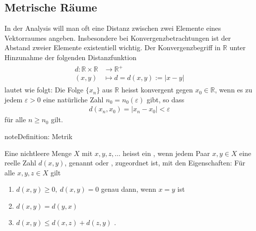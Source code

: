 \documentclass[letterpaper,10pt,english]{jupyterBook}
\begin{document}
\subsection{Metrische Räume}
\label{\detokenize{Funktionalanalysis/Funktionalanalysis:metrische-raume}}
In der Analysis will man oft eine Distanz zwischen zwei Elemente eines Vektorraumes angeben. Insbesondere bei Konvergenzbetrachtungen ist der Abstand zweier Elemente existentiell wichtig. Der Konvergenzbegriff in \(\mathbb{R}\) unter Hinzunahme der folgenden Distanzfunktion
\begin{equation*}
\begin{split}\begin{split} d : \mathbb{R}\times\mathbb{R} & \to \mathbb{R}^+\\
(x,y) & \mapsto  d = d(x,y) := |x-y|\end{split}\end{split}
\end{equation*}
lautet wie folgt: Die Folge \(\{x_n\}\) aus \(\mathbb{R}\) heisst konvergent gegen \(x_0\in\mathbb{R}\), wenn es zu jedem \(\varepsilon > 0\) eine natürliche Zahl \(n_0 = n_0(\varepsilon)\) gibt, so dass
\begin{equation*}
\begin{split}d(x_n,x_0) = |x_n-x_0| < \varepsilon\end{split}
\end{equation*}
für alle \(n \ge n_0\) gilt.

\begin{sphinxadmonition}{note}{Definition: Metrik}

Eine nichtleere Menge \(X\) mit  \(x, y, z, \ldots\) heisst ein , wenn jedem Paar \(x, y \in X\) eine reelle Zahl \(d(x,y)\), genannt  oder , zugeordnet ist, mit den Eigenschaften: Für alle \(x,y,z\in X\) gilt
\begin{enumerate}
%
\item {} 
\(d(x,y) \ge 0,\ d(x,y) = 0\) genau dann, wenn \(x=y\) ist

\item {} 
\(d(x,y) = d(y,x)\) 

\item {} 
\(d(x,y) \le d(x,z) + d(z,y)\) .

\end{enumerate}
\end{sphinxadmonition}
\end{document}
